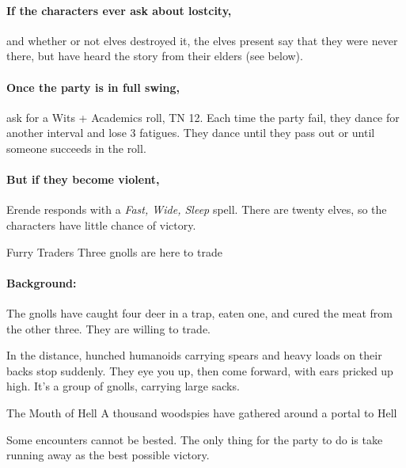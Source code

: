 \begin{multicols}{2}

\paragraph{If the characters ever ask about \gls{lostcity},}
and whether or not elves destroyed it, the elves present say that they were never there, but have heard the story from their elders (see below).

\paragraph{Once the party is in full swing,}
ask for a Wits + Academics roll, TN 12.
Each time the party fail, they dance for another \gls{interval} and lose 3 \glspl{fatigue}.
They dance until they pass out or until someone succeeds in the roll.

\paragraph{But if they become violent,}
Erende responds with a \textit{Fast, Wide, Sleep} spell.
There are twenty elves, so the characters have little chance of victory.

{Furry Traders}%
{Three gnolls are here to trade}%

\paragraph{Background:}
The gnolls have caught four deer in a trap, eaten one, and cured the meat from the other three.  They are willing to trade.

\begin{boxtext}

  In the distance, hunched humanoids carrying spears and heavy loads on their backs stop suddenly.
  They eye you up, then come forward, with ears pricked up high.
  It's a group of gnolls, carrying large sacks.

\end{boxtext}


{\N The Mouth of Hell}%
{A thousand woodspies have gathered around a portal to Hell}%

Some encounters cannot be bested. The only thing for the party to do is take running away as the best possible victory.


\end{multicols}
